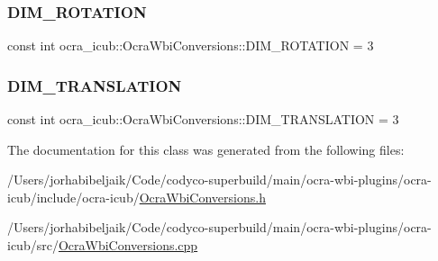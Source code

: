 \subsubsection{\texorpdfstring{D\+I\+M\+\_\+\+R\+O\+T\+A\+T\+I\+ON}{DIM\_ROTATION}}
{\footnotesize\ttfamily const int ocra\+\_\+icub\+::\+Ocra\+Wbi\+Conversions\+::\+D\+I\+M\+\_\+\+R\+O\+T\+A\+T\+I\+ON = 3\hspace{0.3cm}{\ttfamily [static]}}

\hypertarget{classocra__icub_1_1OcraWbiConversions_a7c628bd1208c5e70be458d4dffda4d06}{}\label{classocra__icub_1_1OcraWbiConversions_a7c628bd1208c5e70be458d4dffda4d06} 
\subsubsection{\texorpdfstring{D\+I\+M\+\_\+\+T\+R\+A\+N\+S\+L\+A\+T\+I\+ON}{DIM\_TRANSLATION}}
{\footnotesize\ttfamily const int ocra\+\_\+icub\+::\+Ocra\+Wbi\+Conversions\+::\+D\+I\+M\+\_\+\+T\+R\+A\+N\+S\+L\+A\+T\+I\+ON = 3\hspace{0.3cm}{\ttfamily [static]}}



The documentation for this class was generated from the following files\+:\begin{DoxyCompactItemize}
\item 
/\+Users/jorhabibeljaik/\+Code/codyco-\/superbuild/main/ocra-\/wbi-\/plugins/ocra-\/icub/include/ocra-\/icub/\hyperlink{OcraWbiConversions_8h}{Ocra\+Wbi\+Conversions.\+h}\item 
/\+Users/jorhabibeljaik/\+Code/codyco-\/superbuild/main/ocra-\/wbi-\/plugins/ocra-\/icub/src/\hyperlink{OcraWbiConversions_8cpp}{Ocra\+Wbi\+Conversions.\+cpp}\end{DoxyCompactItemize}
